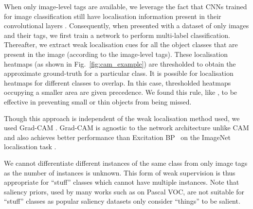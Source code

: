 \documentclass[runningheads]{llncs}
\begin{document}
When only image-level tags are available, we leverage the fact that CNNs trained for image classification still have localisation information present in their convolutional layers \cite{zhou_cvpr_2016}.
Consequently, when presented with a dataset of only images and their tags, we first train a network to perform multi-label classification.
Thereafter, we extract weak localisation cues for all the object classes that are present in the image (according to the image-level tags).
These localisation heatmaps (as shown in Fig.~\ref{fig:cam_example}) are thresholded to obtain the approximate ground-truth for a particular class.
It is possible for localisation heatmaps for different classes to overlap. 
In this case, thresholded heatmaps occupying a smaller area are given precedence.
We found this rule, like \cite{kolesnikov_eccv_2016}, to be effective in preventing small or thin objects from being missed.

Though this approach is independent of the weak localisation method used, we used Grad-CAM \cite{selvaraju_iccv_2017}.
Grad-CAM is agnostic to the network architecture unlike CAM \cite{zhou_cvpr_2016} and also achieves better performance than Excitation BP~\cite{zhang_eccv_2016} on the ImageNet localisation task \cite{russakovsky_ijcv_2015}.

We cannot differentiate different instances of the same class from only image tags as the number of instances is unknown.
This form of weak supervision is thus appropriate for ``stuff'' classes which cannot have multiple instances.
Note that saliency priors, used by many works such as \cite{wei_cvpr_2017,wei_pami_2017,oh_cvpr_2017} on Pascal VOC, are not suitable for ``stuff'' classes as popular saliency datasets \cite{cheng_pami_2015,yang_cvpr_2013,shi_pami_2016} only consider ``things'' to be salient. 
\end{document}
